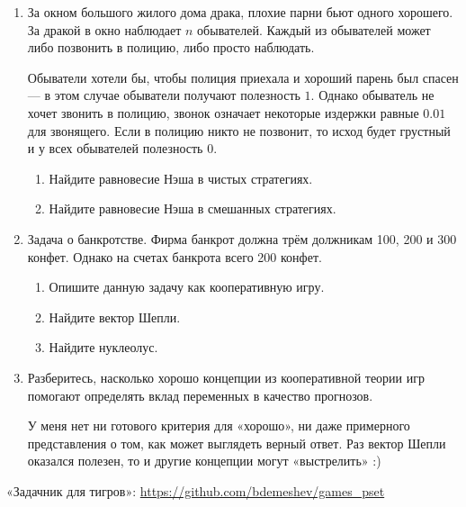\documentclass[12pt]{article} %
\theoremstyle{definition} %
\begin{document}
\begin{enumerate}
\item За окном большого жилого дома драка, плохие парни бьют одного хорошего. 
За дракой в окно наблюдает $n$ обывателей. 
Каждый из обывателей может либо позвонить в полицию, либо просто наблюдать. 

Обыватели хотели бы, чтобы полиция приехала и хороший парень был спасен — в этом случае обыватели получают полезность $1$. 
Однако обыватель не хочет звонить в полицию, звонок означает некоторые издержки равные $0.01$ для звонящего. 
Если в полицию никто не позвонит, то исход будет грустный и у всех обывателей полезность $0$. 

\begin{enumerate}
  \item Найдите равновесие Нэша в чистых стратегиях.
  \item Найдите равновесие Нэша в смешанных стратегиях.
\end{enumerate}



\item Задача о банкротстве. Фирма банкрот должна трём должникам 100, 200 и 300 конфет. 
Однако на счетах банкрота всего 200 конфет. 

\begin{enumerate}
  \item Опишите данную задачу как кооперативную игру. 
  \item Найдите вектор Шепли.
  \item Найдите нуклеолус. 
\end{enumerate}


\item Разберитесь, насколько хорошо концепции из кооперативной теории игр 
помогают определять вклад переменных в качество прогнозов. 

У меня нет ни готового критерия для «хорошо», ни даже примерного представления о том, 
как может выглядеть верный ответ. Раз вектор Шепли оказался полезен, то и другие 
концепции могут «выстрелить» :)


\end{enumerate}


«Задачник для тигров»: \url{https://github.com/bdemeshev/games_pset}
\end{document}
